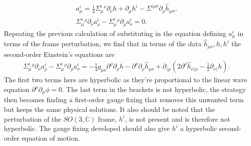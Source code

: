\documentclass[10pt]{report}
\theoremstyle{definition}
\newcommand{\C}[0]{\mathbb{C}}
\begin{document}
    \begin{align}
        a^i_\mu = \frac{1}{4} \Sigma^i_\mu{}^\nu \partial_\nu h + \partial_\mu h^i - \Sigma^{i\rho\sigma} \partial_\rho \hat{h}_{\mu\sigma}. \label{eq:lin-connection-pert-in-h-and-h-hat} \\
        \Sigma^i_\mu{}^\rho \partial_\nu a^i_\rho - \Sigma^i_\mu{}^\rho \partial_\rho a^i_\nu = 0. \label{eq:lin-einstein-equations-on-a}
    \end{align}
    Repeating the previous calculation of substituting in the equation defining $a^i_\mu$ in terms of the frame perturbation, we find that in terms of the data $\hat{h}_{\mu\nu}, h, h^i$ the second-order Einstein's equations are
    \begin{align}
        \Sigma^i_\mu{}^\rho \partial_\nu a^i_\rho - \Sigma^i_\mu{}^\rho \partial_\rho a^i_\nu = -\frac{1}{4} g_{\mu\nu} \partial^\rho \partial_\rho h - \partial^\rho \partial_\rho \hat{h}_{\mu\nu} + \partial_{(\mu} \left( 2 \partial^\rho \hat{h}_{\nu)\rho} - \frac{1}{2} \partial_{\nu)} h \right). \label{eq:lin-einstein-condition-second-order-in-h}
    \end{align}
    The first two terms here are hyperbolic as they're proportional to the linear wave equation $\partial^\mu \partial_\mu \phi = 0$. The last term in the brackets is not hyperbolic, the strategy then becomes finding a first-order gauge fixing that removes this unwanted term but keeps the same physical solutions. It also should be noted that the perturbation of the $SO(3,\C)$ frame, $h^i$, is not present and is therefore not hyperbolic. The gauge fixing developed should also give $h^i$ a hyperbolic second-order equation of motion.
\end{document}
